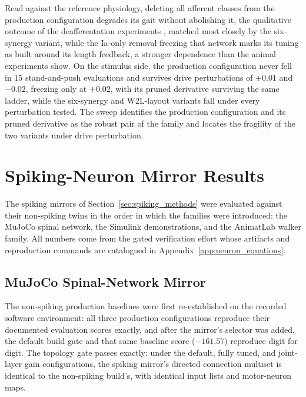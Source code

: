 Read against the reference physiology, deleting all afferent classes from the production configuration degrades its gait without abolishing it, the qualitative outcome of the deafferentation experiments \citep{akay_degradation_2014}, matched most closely by the six-synergy variant, while the Ia-only removal freezing that network marks its tuning as built around its length feedback, a stronger dependence than the animal experiments show. On the stimulus side, the production configuration never fell in 15 stand-and-push evaluations and survives drive perturbations of $\pm 0.01$ and $-0.02$, freezing only at $+0.02$, with its pruned derivative surviving the same ladder, while the six-synergy and W2L-layout variants fall under every perturbation tested. The sweep identifies the production configuration and its pruned derivative as the robust pair of the family and locates the fragility of the two variants under drive perturbation.

\section{Spiking-Neuron Mirror Results}\label{sec:spiking_results}

The spiking mirrors of Section~\ref{sec:spiking_methods} were evaluated against their non-spiking twins in the order in which the families were introduced: the MuJoCo spinal network, the Simulink demonstrations, and the AnimatLab walker family. All numbers come from the gated verification effort whose artifacts and reproduction commands are catalogued in Appendix~\ref{app:neuron_equations}.

\subsection{MuJoCo Spinal-Network Mirror}

The non-spiking production baselines were first re-established on the recorded software environment: all three production configurations reproduce their documented evaluation scores exactly, and after the mirror's selector was added, the default build gate and that same baseline score ($-161.57$) reproduce digit for digit. The topology gate passes exactly: under the default, fully tuned, and joint-layer gain configurations, the spiking mirror's directed connection multiset is identical to the non-spiking build's, with identical input lists and motor-neuron maps.

